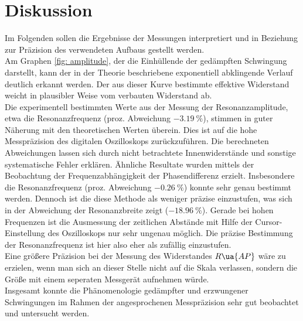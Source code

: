 \section{Diskussion}
Im Folgenden sollen die Ergebnisse der Messungen interpretiert und in Beziehung zur Präzision des verwendeten Aufbaus gestellt werden. \\
Am Graphen \ref{fig: amplitude}, der die Einhüllende der gedämpften Schwingung darstellt, kann der in der Theorie beschriebene exponentiell abklingende
Verlauf deutlich erkannt werden. Der aus dieser Kurve bestimmte effektive Widerstand weicht in plausibler Weise vom verbauten Widerstand ab.\\
Die experimentell bestimmten Werte aus der Messung der Resonanzamplitude, etwa die Resonanzfrequenz (proz. Abweichung $\SI{-3.19}{\percent}$),
stimmen in guter Näherung mit den theoretischen Werten überein. Dies ist auf die hohe Messpräzision des digitalen Oszilloskops zurückzuführen.
Die berechneten Abweichungen lassen sich durch nicht betrachtete Innenwiderstände und sonstige systematische Fehler erklären. Ähnliche Resultate
wurden mittels der Beobachtung der Frequenzabhängigkeit der Phasendifferenz erzielt. Insbesondere die Resonanzfrequenz (proz. Abweichung $\SI{-0.26}{\percent}$) konnte
sehr genau bestimmt werden. Dennoch ist die diese Methode als weniger präzise einzustufen, was sich in der Abweichung der Resonanzbreite
zeigt ($\SI{-18.96}{\percent}$). Gerade bei hohen Frequenzen ist die Ausmessung der zeitlichen Abstände mit Hilfe der Cursor-Einstellung des Oszilloskops
nur sehr ungenau möglich. Die präzise Bestimmung der Resonanzfrequenz ist hier also eher als zufällig einzustufen. \\
Eine größere Präzision bei der Messung des Widerstandes $R\ua{AP}$ wäre zu erzielen, wenn man sich an dieser Stelle nicht auf die Skala verlassen, sondern
die Größe mit einem seperaten Messgerät aufnehmen würde.\\
Insgesamt konnte die Phänomenologie gedämpfter und erzwungener Schwingungen im Rahmen der angesprochenen Messpräzision sehr gut beobachtet und untersucht werden.

